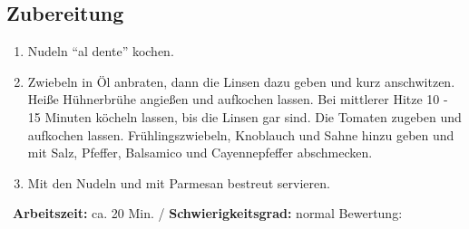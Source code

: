 \begin{minipage}[t]{0.58\textwidth}
\vspace{0pt}
\subsection*{Zubereitung}
\begin{enumerate}[leftmargin=*, itemindent=14pt]

\item Nudeln "`al dente"' kochen. 

\item Zwiebeln in Öl anbraten, dann die Linsen dazu geben und kurz anschwitzen. Heiße Hühnerbrühe angießen und aufkochen lassen. Bei mittlerer Hitze 10 - 15 Minuten köcheln lassen, bis die Linsen gar sind. Die Tomaten zugeben und aufkochen lassen. Frühlingszwiebeln, Knoblauch und Sahne hinzu geben und mit Salz, Pfeffer, Balsamico und Cayennepfeffer abschmecken. 

\item Mit den Nudeln und mit Parmesan bestreut servieren.
\end{enumerate}
\end{minipage}
\vfill
\decothreeright \, \textbf{Arbeitszeit:} ca. 20 Min. / \textbf{Schwierigkeitsgrad:} normal \decothreeleft \hfill Bewertung: \CIRCLE  \CIRCLE \CIRCLE \CIRCLE \CIRCLE 
